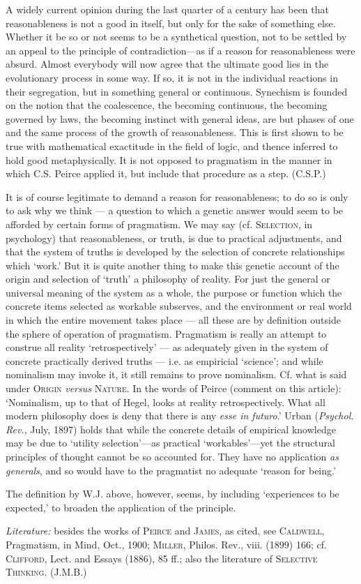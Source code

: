 \documentclass{article}
\begin{document}
A widely current opinion during the last quarter of a century has been that reasonableness is not a good in itself, but only for the sake of something else. Whether it be so or not seems to be a synthetical question, not to be settled by an appeal to the principle of contradiction---as if a reason for reasonableness were absurd. Almost everybody will now agree that the ultimate good lies in the evolutionary process in some way. If so, it is not in the individual reactions in their segregation, but in something general or continuous. Synechism is founded on the notion that the coalescence, the becoming continuous, the becoming governed by laws, the becoming instinct with general ideas, are but phases of one and the same process of the growth of reasonableness. This is first shown to be true with mathematical exactitude in the field of logic, and thence inferred to hold good metaphysically. It is not opposed to pragmatism in the manner in which C.S. Peirce applied it, but include that procedure as a step. \hfill (C.S.P.)

It is of course legitimate to demand a reason for reasonableness; to do so is only to ask why we think --- a question to which a genetic answer would seem to be afforded by certain forms of pragmatism. We may say (cf. \textsc{Selection}, in psychology) that reasonableness, or truth, is due to practical adjustments, and that the system of truths is developed by the selection of concrete relationships which `work.' But it is quite another thing to make this genetic account of the origin and selection of `truth' a philosophy of reality. For just the general or universal meaning of the system as a whole, the purpose or function which the concrete items selected as workable subserves, and the environment or real world in which the entire movement takes place --- all these are by definition outside the sphere of operation of pragmatism. Pragmatism is really an attempt to construe all reality `retrospectively' --- as adequately given in the system of concrete practically derived truths --- i.e. as empiricial `science'; and while nominalism may invoke it, it still remains to prove nominalism. Cf. what is said under \textsc{Origin} \emph{versus} \textsc{Nature}. In the words of Peirce (comment on this article): `Nominalism, up to that of Hegel, looks at reality retrospectively. What all modern philosophy does is deny that there is any \emph{esse in futuro}.' Urban (\textit{Psychol. Rev.}, July, 1897) holds that while the concrete details of empirical knowledge may be due to `utility selection'---as practical `workables'---yet the structural principles of thought cannot be so accounted for. They have no application \textit{as generals}, and so would
have to the pragmatist no adequate `reason for being.'

The definition by W.J. above, however, seems, by including `experiences to be expected,' to broaden the application of the principle. 

\textit{Literature:} besides the works of \textsc{Peirce} and \textsc{James}, as cited, see \textsc{Caldwell}, Pragmatism, in Mind, Oct., 1900; \textsc{Miller}, Philos. Rev., viii. (1899) 166; cf. \textsc{Clifford}, Lect. and Essays (1886), 85 ff.; also the literature of \textsc{Selective Thinking}. \hfill(J.M.B.)
\end{document}
